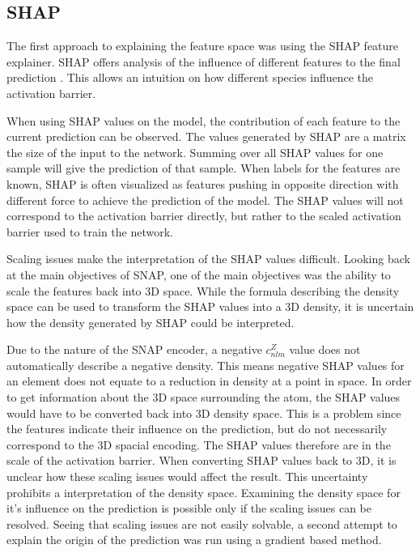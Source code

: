 \subsection{SHAP}

The first approach to explaining the feature space was using the SHAP feature explainer.
SHAP offers analysis of the influence of different features to the final prediction \cite{NIPS2017_7062}.
This allows an intuition on how different species influence the activation barrier.

When using SHAP values on the model, the contribution of each feature to the current prediction can be observed.
The values generated by SHAP are a matrix the size of the input to the network.
Summing over all SHAP values for one sample will give the prediction of that sample.
When labels for the features are  known, SHAP is often visualized as features pushing in opposite direction with different force 
to achieve the prediction of the model.
The SHAP values will not correspond to the activation barrier directly,
but rather to the scaled activation barrier used to train the network.

Scaling issues make the interpretation of the SHAP values difficult.
Looking back at the main objectives of SNAP, one of the main objectives was the ability to scale the features back into 3D space.
While the formula describing the density space can be used to transform the SHAP values 
into a 3D density, it is uncertain how the density generated by SHAP could be interpreted.

Due to the nature of the SNAP encoder, a negative $c_{nlm}^Z$ value does not automatically 
describe a negative density.
This means negative SHAP values for an element does not equate to a reduction in density
at a point in space.
In order to get information about the 3D space surrounding the atom, the SHAP values would have to be converted back into 3D density space.
This is a problem since the features indicate their influence on the prediction, but do not necessarily correspond 
to the 3D spacial encoding.
The SHAP values therefore are in the scale of the activation barrier.
When converting SHAP values back to 3D, it is unclear how these scaling issues would 
affect the result. 
This uncertainty prohibits a interpretation of the density space.
Examining the density space for it's influence on the prediction is possible only if the scaling
issues can be resolved.
Seeing that scaling issues are not easily solvable, a second attempt to explain the origin of the prediction
was run using a gradient based method.


